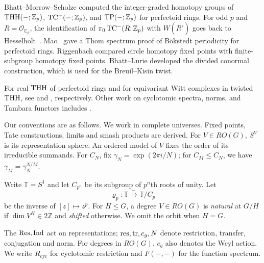 Bhatt--Morrow--Scholze \cite[Theorem~1.6]{BMS} computed the
integer-graded homotopy groups of $\operatorname{THH}(-;\mathbb Z_p)$,
$\operatorname{TC}^-(-;\mathbb Z_p)$, and $\operatorname{TP}(-;\mathbb Z_p)$
for perfectoid rings.
For odd $p$ and $R=\mathcal O_{\mathbb C_p}$, the identification of
$\pi_0\operatorname{TC}^-(R;\mathbb Z_p)$ with $W(R^\flat)$ goes back
to Hesselholt~\cite{HesLocal}.
Mao~\cite{MaoThom} gave a Thom spectrum proof of B\"okstedt
periodicity for perfectoid rings.
Riggenbach \cite{Riggenbach} compared circle
homotopy fixed points with finite-subgroup
homotopy fixed points.
Bhatt--Lurie \cite{BhattLurie} developed the
divided conormal construction, which is used for the
Breuil--Kisin twist.

For real $\operatorname{THH}$ of perfectoid rings and for equivariant Witt complexes
in twisted $\operatorname{THH}$, see \cite{HornbostelPark} and \cite{BGKPY}, respectively.
Other work on cyclotomic spectra,
norms, and Tambara functors includes
\cite{AN,NS,NormTHH,BMCyclotomic,BMYRelative,
BHNorm,Ullman,Balderrama,HKSZOperations}.

Our conventions are as follows.
We work in complete universes. Fixed points, Tate constructions,
limits and smash products are derived.
For $V\in RO(G)$, $S^V$ is its representation sphere.
An ordered model of $V$ fixes the order of its irreducible summands. For $C_N$, fix
$\gamma_N=\exp(2\pi i/N)$; for $C_M\le C_N$, we have
$\gamma_M=\gamma_N^{N/M}$.

\begin{definition}\label{def:base-class}
Write $\mathbb T=S^1$ and let $C_{p^n}$ be its subgroup of
$p^n$th roots of unity. Let
\[
\varrho_p:\mathbb T\xrightarrow{\sim}\mathbb T/C_p
\]
be the inverse of $[z]\mapsto z^p$.
For $H\le G$, a degree $V\in RO(G)$ is \emph{natural} at $G/H$
if $\dim V^H\in2\mathbb Z$ and \emph{shifted} otherwise.
We omit the orbit when $H=G$.
\end{definition}

The $\operatorname{Res},\operatorname{Ind}$ act on representations;
$\operatorname{res},\operatorname{tr},c_g,N$ denote restriction, transfer, conjugation and norm.
For degrees in $RO(G)$, $c_g$ also denotes the Weyl action.
We write $R_{\mathrm{cyc}}$ for cyclotomic restriction and
$F(-,-)$ for the function spectrum.

